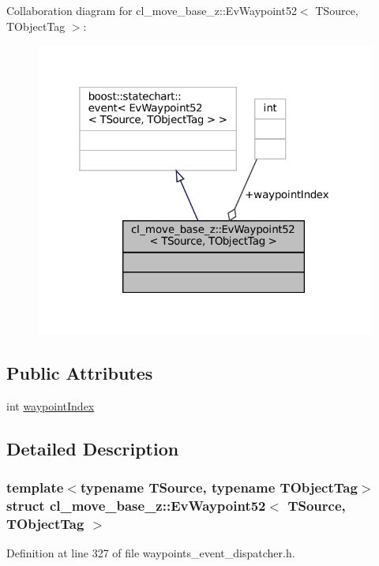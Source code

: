 Collaboration diagram for cl\+\_\+move\+\_\+base\+\_\+z\+:\+:Ev\+Waypoint52$<$ T\+Source, T\+Object\+Tag $>$\+:
\nopagebreak
\begin{figure}[H]
\begin{center}
\leavevmode
\includegraphics[width=319pt]{structcl__move__base__z_1_1EvWaypoint52__coll__graph}
\end{center}
\end{figure}
\subsection*{Public Attributes}
\begin{DoxyCompactItemize}
\item 
int \hyperlink{structcl__move__base__z_1_1EvWaypoint52_a1111dd4042495bde499d72976f43732b}{waypoint\+Index}
\end{DoxyCompactItemize}


\subsection{Detailed Description}
\subsubsection*{template$<$typename T\+Source, typename T\+Object\+Tag$>$\newline
struct cl\+\_\+move\+\_\+base\+\_\+z\+::\+Ev\+Waypoint52$<$ T\+Source, T\+Object\+Tag $>$}



Definition at line 327 of file waypoints\+\_\+event\+\_\+dispatcher.\+h.




